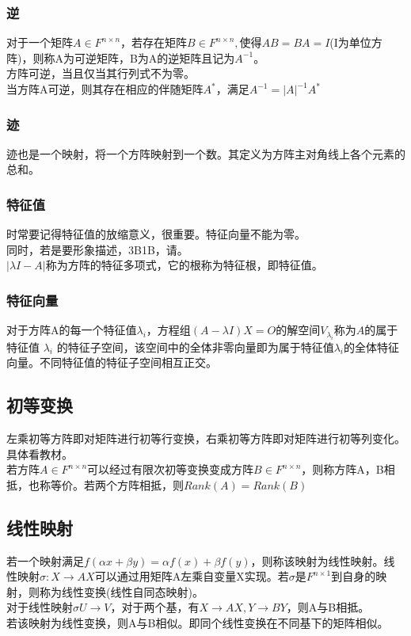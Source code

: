 \documentclass[UTF8]{ctexart}
\begin{document}
\subsubsection{逆}
对于一个矩阵$A\in F^{n\times n}$，若存在矩阵$B\in F^{n\times n},$使得$AB=BA=I$(I为单位方阵)，则称A为可逆矩阵，B为A的逆矩阵且记为$A^{-1}$。\\
\indent
方阵可逆，当且仅当其行列式不为零。\\
\indent
当方阵A可逆，则其存在相应的伴随矩阵$A^{*}$，满足$A^{-1}=|A|^{-1}A^{*}$
\subsubsection{迹}
迹也是一个映射，将一个方阵映射到一个数。其定义为方阵主对角线上各个元素的总和。
\subsubsection{特征值}
时常要记得特征值的放缩意义，很重要。特征向量不能为零。\\
\indent
同时，若是要形象描述，3B1B，请。\\
\indent
$|\lambda I-A|$称为方阵的特征多项式，它的根称为特征根，即特征值。
\subsubsection{特征向量}
对于方阵A的每一个特征值$\lambda_i$，方程组$(A-\lambda I)X=\mathit{O}$的解空间$V_{\lambda_{i}}$称为$A$的属于特征值 $\lambda_{i}$ 的特征子空间，该空间中的全体非零向量即为属于特征值$\lambda_{i}$的全体特征向量。不同特征值的特征子空间相互正交。
\subsection{初等变换}
左乘初等方阵即对矩阵进行初等行变换，右乘初等方阵即对矩阵进行初等列变化。具体看教材。\\
\indent
若方阵$A\in F^{n\times n}$可以经过有限次初等变换变成方阵$B\in F^{n\times n}$，则称方阵A，B相抵，也称等价。若两个方阵相抵，则$Rank(A)=Rank(B)$
\subsection{线性映射}
若一个映射满足$f(\alpha x+\beta y)=\alpha f(x)+\beta f(y)$，则称该映射为线性映射。线性映射$\sigma:X\rightarrow AX$可以通过用矩阵A左乘自变量X实现。若$\sigma$是$F^{n\times 1}$到自身的映射，则称为线性变换(线性自同态映射)。\\
\indent
对于线性映射$\sigma U\rightarrow V$，对于两个基，有$X\rightarrow AX,Y\rightarrow BY$，则A与B相抵。\\
\indent
若该映射为线性变换，则A与B相似。即同个线性变换在不同基下的矩阵相似。
\end{document}
